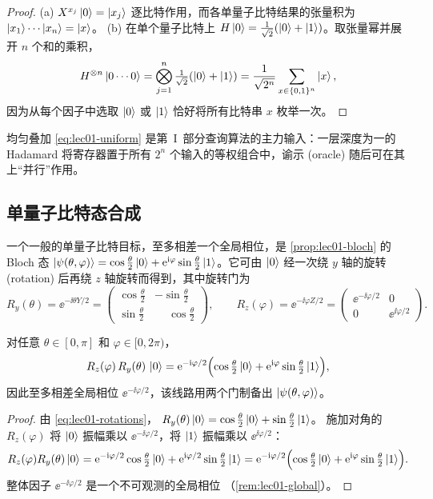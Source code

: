 \begin{proof}
(a) $X^{x_{j}}\ket{0}=\ket{x_{j}}$ 逐比特作用，而各单量子比特结果的张量积为
$\ket{x_{1}}\cdots\ket{x_{n}}=\ket{x}$。
(b) 在单个量子比特上 $H\ket{0}=\tfrac{1}{\sqrt2}(\ket{0}+\ket{1})$。取张量幂并展开 $n$ 个和的乘积，
\[
  H^{\otimes n}\ket{0\cdots0}
    =\bigotimes_{j=1}^{n}\tfrac{1}{\sqrt2}(\ket{0}+\ket{1})
    =\frac{1}{\sqrt{2^{n}}}\sum_{x\in\{0,1\}^{n}}\ket{x},
\]
因为从每个因子中选取 $\ket{0}$ 或 $\ket{1}$ 恰好将所有比特串 $x$ 枚举一次。
\end{proof}

均匀叠加 \eqref{eq:lec01-uniform} 是第~I~部分查询算法的主力输入：一层深度为一的 Hadamard 将寄存器置于所有 $2^{n}$ 个输入的等权组合中，谕示 (oracle) 随后可在其上``并行''作用。

\subsection{单量子比特态合成}

一个一般的单量子比特目标，至多相差一个全局相位，是 \cref{prop:lec01-bloch} 的 Bloch 态
$\ket{\psi(\theta,\varphi)}=\cos\tfrac{\theta}{2}\ket{0}+\mathrm{e}^{\mathrm{i}\varphi}\sin\tfrac{\theta}{2}\ket{1}$。它可由 $\ket{0}$ 经一次绕 $y$ 轴的旋转 (rotation) 后再绕 $z$ 轴旋转而得到，其中旋转门为
\begin{equation}\label{eq:lec01-rotations}
  R_{y}(\theta)=\ee^{-\ii\theta Y/2}
    =\begin{pmatrix}\cos\tfrac{\theta}{2}&-\sin\tfrac{\theta}{2}\\[2pt]
      \sin\tfrac{\theta}{2}&\phantom{-}\cos\tfrac{\theta}{2}\end{pmatrix},
  \qquad
  R_{z}(\varphi)=\ee^{-\ii\varphi Z/2}
    =\begin{pmatrix}\ee^{-\ii\varphi/2}&0\\ 0&\ee^{\ii\varphi/2}\end{pmatrix}.
\end{equation}

\begin{proposition}[单量子比特制备]\label{prop:lec01-1qprep}
对任意 $\theta\in[0,\pi]$ 和 $\varphi\in[0,2\pi)$，
\[
  R_{z}(\varphi)\,R_{y}(\theta)\,\ket{0}
    =\mathrm{e}^{-\mathrm{i}\varphi/2}\Bigl(\cos\tfrac{\theta}{2}\ket{0}+\mathrm{e}^{\mathrm{i}\varphi}\sin\tfrac{\theta}{2}\ket{1}\Bigr),
\]
因此至多相差全局相位 $\ee^{-\ii\varphi/2}$，该线路用两个门制备出
$\ket{\psi(\theta,\varphi)}$。
\end{proposition}

\begin{proof}
由 \eqref{eq:lec01-rotations}，
$R_{y}(\theta)\ket{0}=\cos\tfrac{\theta}{2}\ket{0}+\sin\tfrac{\theta}{2}\ket{1}$。
施加对角的 $R_{z}(\varphi)$ 将 $\ket{0}$ 振幅乘以
$\ee^{-\ii\varphi/2}$，将 $\ket{1}$ 振幅乘以 $\ee^{\ii\varphi/2}$：
\[
  R_{z}(\varphi)R_{y}(\theta)\ket{0}
    =\mathrm{e}^{-\mathrm{i}\varphi/2}\cos\tfrac{\theta}{2}\ket{0}
     +\mathrm{e}^{\mathrm{i}\varphi/2}\sin\tfrac{\theta}{2}\ket{1}
    =\mathrm{e}^{-\mathrm{i}\varphi/2}\Bigl(\cos\tfrac{\theta}{2}\ket{0}+\mathrm{e}^{\mathrm{i}\varphi}\sin\tfrac{\theta}{2}\ket{1}\Bigr).
\]
整体因子 $\ee^{-\ii\varphi/2}$ 是一个不可观测的全局相位
（\cref{rem:lec01-global}）。
\end{proof}

